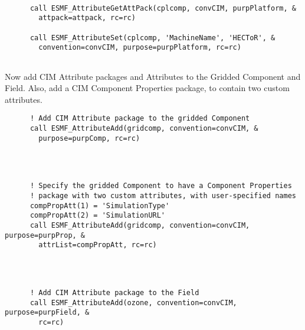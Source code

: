 
 \begin{verbatim}

      call ESMF_AttributeGetAttPack(cplcomp, convCIM, purpPlatform, &
        attpack=attpack, rc=rc)

      call ESMF_AttributeSet(cplcomp, 'MachineName', 'HECToR', &
        convention=convCIM, purpose=purpPlatform, rc=rc)
 
\end{verbatim}
 

  \begin{sloppypar}
      Now add CIM Attribute packages and Attributes to the Gridded Component
      and Field.  Also, add a CIM Component Properties package, to contain
      two custom attributes.
  \end{sloppypar} 

 \begin{verbatim}
      ! Add CIM Attribute package to the gridded Component
      call ESMF_AttributeAdd(gridcomp, convention=convCIM, &
        purpose=purpComp, rc=rc)
 
\end{verbatim}
 

 \begin{verbatim}


      ! Specify the gridded Component to have a Component Properties
      ! package with two custom attributes, with user-specified names
      compPropAtt(1) = 'SimulationType'
      compPropAtt(2) = 'SimulationURL'
      call ESMF_AttributeAdd(gridcomp, convention=convCIM, purpose=purpProp, &
        attrList=compPropAtt, rc=rc)
 
\end{verbatim}
 

 \begin{verbatim}


      ! Add CIM Attribute package to the Field
      call ESMF_AttributeAdd(ozone, convention=convCIM, purpose=purpField, &
        rc=rc)
 
\end{verbatim}
 

